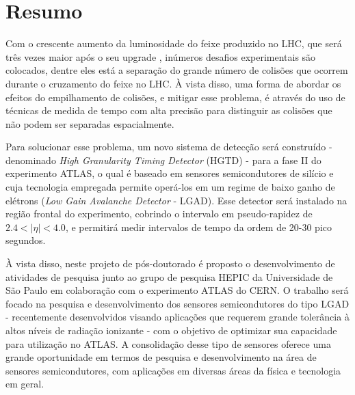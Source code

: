 \chapter*{Resumo}


Com o crescente aumento da luminosidade do feixe produzido no LHC, que será três vezes maior após o seu upgrade \cite{tdr}, inúmeros desafios experimentais são colocados, dentre eles está a separação do grande número de colisões que ocorrem durante o cruzamento do feixe no LHC. À vista disso, uma forma de abordar os efeitos do empilhamento de colisões, e mitigar esse problema, é através do uso de técnicas de medida de tempo com alta precisão para distinguir as colisões que não podem ser separadas espacialmente. 

Para solucionar esse problema, um novo sistema de detecção será construído - denominado {\it High Granularity Timing Detector} (HGTD) - para a fase II do experimento ATLAS, o qual é baseado em sensores semicondutores de silício e cuja tecnologia empregada permite operá-los em um regime de baixo ganho de elétrons ({\it Low Gain Avalanche Detector} - LGAD). Esse detector será instalado na região frontal do experimento, cobrindo o intervalo em pseudo-rapidez de $2.4< |\eta| <4.0$, e permitirá medir intervalos de tempo da ordem de 20-30 pico segundos.


À vista disso, neste projeto de pós-doutorado é proposto o desenvolvimento de atividades de pesquisa junto ao grupo de pesquisa HEPIC da Universidade de São Paulo em colaboração com o experimento ATLAS do CERN. O trabalho será focado na pesquisa e desenvolvimento dos sensores semicondutores do tipo LGAD - recentemente desenvolvidos visando aplicações que requerem grande tolerância à altos níveis de radiação ionizante \cite{JIN_LGAD,NIMA_LGAD} - com o objetivo de optimizar sua capacidade para utilização no ATLAS. A consolidação desse tipo de sensores oferece uma grande oportunidade em termos de pesquisa e desenvolvimento na área de sensores semicondutores, com aplicações em diversas áreas da física e tecnologia em geral.

